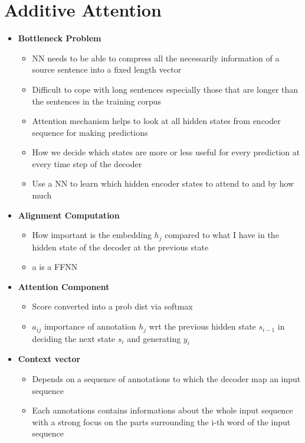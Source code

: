 \section{Additive Attention}
\begin{itemize}
    \item \textbf{Bottleneck Problem}
    \begin{itemize}
        \item NN needs to be able to compress all the necessarily information of a source sentence into a fixed length vector
        \item Difficult to cope with long sentences especially those that are longer than the sentences in the training corpus 
        \item Attention mechanism helps to look at all hidden states from encoder sequence for making predictions
        \item How we decide which states are more or less useful for every prediction at every time step of the decoder
        \item Use a NN to learn which hidden encoder states to attend to and by how much
    \end{itemize}
    \item \textbf{Alignment Computation}
    \begin{itemize}
        \item How important is the embedding \(h_j\) compared to what I have in the hidden state of the decoder at the previous state
        \item a is a FFNN
    \end{itemize}
    \item \textbf{Attention Component}
    \begin{itemize}
        \item Score converted into a prob dist via softmax
        \item \(a_{ij}\) importance of annotation \(h_j\) wrt the previous hidden state \(s_{i-1}\) in deciding the next state \(s_i\) and generating \(y_i\) 
    \end{itemize}
    \item \textbf{Context vector}
    \begin{itemize}
        \item Depends on a sequence of annotations to which the decoder map an input sequence
        \item Each annotations contains informations about the whole input sequence with a strong focus on the parts surrounding the i-th word of the input sequence 

\end{itemize}
\end{itemize}
